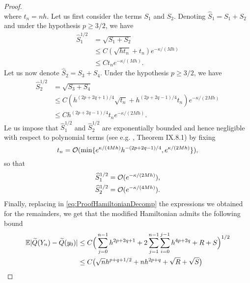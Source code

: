\documentclass[10pt]{article}
\begin{document}
\begin{proof}
\begin{equation}
	\end{equation}
	where $t_n = nh$. Let us first consider the terms $S_1$ and $S_2$. Denoting $\widehat S_1 = S_1 + S_2$ and under the hypothesis $p \geq 3/2$, we have
	\begin{equation}
	\begin{aligned}
		\widehat S_1^{1/2} &= \sqrt{S_1 + S_2} \\
		&\leq C (\sqrt{h t_n} + t_n)e^{-\kappa/(Mh)}\\
		&\leq C t_n e^{-\kappa/(Mh)}.
	\end{aligned}
	\end{equation}
	Let us now denote $\widehat S_2 = S_3 + S_4$. Under the hypothesis $p \geq 3/2$, we have
	\begin{equation}
	\begin{aligned}
		\widehat S_2^{1/2} &= \sqrt{S_3 + S_4} \\
		&\leq C (h^{(2p+2q+1)/4} \sqrt{t_n} + h^{(2p+2q-1)/4} t_n)e^{-\kappa/(2Mh)}\\
		&\leq C h^{(2p+2q-1)/4} t_n e^{-\kappa/(2Mh)}.
	\end{aligned}
	\end{equation} 
	Le us impose that $\widehat S_1^{1/2}$ and $\widehat S_2^{1/2}$ are exponentially bounded and hence negligible with respect to polynomial terms (see e.g. \cite{HLW06}, Theorem IX.8.1) by fixing
	\begin{equation}\label{eq:ProofHamiltonianTimeSpans}
	t_n = \mathcal{O}(\min\{e^{\kappa/(4Mh)} h^{-(2p+2q-1)/4}, e^{\kappa/(2Mh)}\}),
	\end{equation}
	so that
	\begin{equation}
	\begin{aligned}
		\widehat S_1^{1/2} = \mathcal{O}(e^{-\kappa/(2Mh)}),\\
		\widehat S_2^{1/2} = \mathcal{O}(e^{-\kappa/(4Mh)}).\\
	\end{aligned}
	\end{equation}
	Finally, replacing in \eqref{eq:ProofHamiltonianDecomp} the expressions we obtained for the remainders, we get that the modified Hamiltonian admits the following bound
	\begin{equation}
	\begin{aligned}
		\E \abs{\tilde Q(Y_n) - \tilde Q(y_0)} &\leq C \Big(\sum_{j=0}^{n-1} h^{2p+2q+1} + 2\sum_{j=1}^{n-1} \sum_{i=0}^{j-1} h^{4p+2q} + R + S\Big)^{1/2} \\
		&\leq C \big(\sqrt{n} h^{p+q+1/2} + n h^{2p+q} + \sqrt{R} + \sqrt{S}\big) \\

\end{aligned}
\end{equation}
\end{proof}
\end{document}
